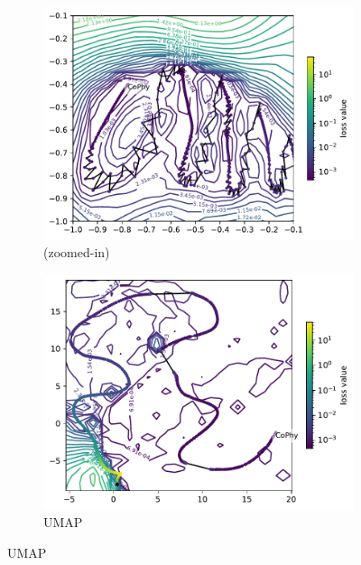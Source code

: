 \documentclass[letterpaper]{article} %
\begin{document}
\begin{figure}[htbp]
\begin{subfigure}[b]{0.3\textwidth}
                \caption{\proposedautencoder{}}
             \label{fig:PCAvsAE_out}
              \end{subfigure}
              \hfill
              \begin{subfigure}[b]{0.33\textwidth}
                \includegraphics[width=\textwidth]{figures/round3/Cophy_NV_zoomed/map_phy_total_loss.pdf}
                \caption{\proposedautencoder{} (zoomed-in)}
                \label{fig:PCAvsAE_zoomed}
              \end{subfigure}
              \hfill
                \begin{subfigure}[b]{0.3\textwidth}
                \includegraphics[width=\textwidth]{figures/round3/UMAP/map_phy_total_loss.pdf}
                \caption{UMAP}
                \label{fig:UMAPloss}
              \end{subfigure}


\end{figure}
\end{document}
